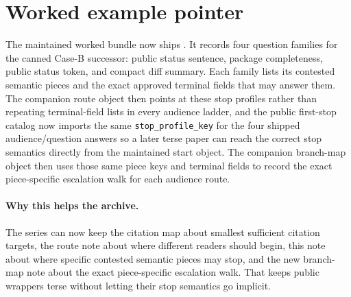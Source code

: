 \documentclass[11pt]{article}
\begin{document}
\section{Worked example pointer}
The maintained worked bundle now ships .\cite{series:workedexample}
It records four question families for the canned Case-B successor: public status sentence, package completeness, public status token, and compact diff summary.
Each family lists its contested semantic pieces and the exact approved terminal fields that may answer them.
The companion route object then points at these stop profiles rather than repeating terminal-field lists in every audience ladder, and the public first-stop catalog now imports the same \texttt{stop\_profile\_key} for the four shipped audience/question answers so a later terse paper can reach the correct stop semantics directly from the maintained start object. The companion branch-map object then uses those same piece keys and terminal fields to record the exact piece-specific escalation walk for each audience route.\cite{series:challengeroutes,series:challengebranches}

\paragraph{Why this helps the archive.}
The series can now keep the citation map about smallest sufficient citation targets, the route note about where different readers should begin, this note about where specific contested semantic pieces may stop, and the new branch-map note about the exact piece-specific escalation walk.
That keeps public wrappers terse without letting their stop semantics go implicit.
\end{document}
